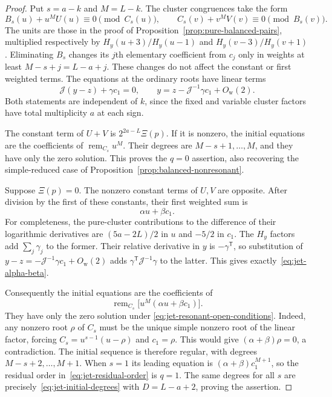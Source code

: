 \documentclass[11pt]{article}
\theoremstyle{definition}
\begin{document}
\begin{proof}
Put $s=a-k$ and $M=L-k$. The cluster congruences take the form
\[
 B_s(u)+u^MU(u)\equiv0\pmod{C_s(u)},\qquad
 C_s(v)+v^MV(v)\equiv0\pmod{B_s(v)}.
\]
The units are those in the proof of
Proposition~\ref{prop:pure-balanced-pairs}, multiplied respectively by
$H_y(u+3)/H_y(u-1)$ and $H_y(v-3)/H_y(v+1)$.
Eliminating $B_s$ changes its $j$th elementary coefficient from $c_j$
only in weights at least $M-s+j=L-a+j$. These changes do not affect
the constant or first weighted terms. The equations at the ordinary
roots have linear terms
\[
 \mathcal J(y-z)+\gamma c_1=0,
 \qquad y=z-\mathcal J^{-1}\gamma c_1+O_{\mathrm w}(2).
\]
Both statements are independent of $k$, since the fixed and variable
cluster factors have total multiplicity $a$ at each sign.

The constant term of $U+V$ is $2^{2a-L}\Xi(p)$. If it is nonzero,
the initial equations are the coefficients of
$\operatorname{rem}_{C_s}u^M$. Their degrees are
$M-s+1,\ldots,M$, and they have only the zero solution. This proves
the $q=0$ assertion, also recovering the simple-reduced case of
Proposition~\ref{prop:balanced-nonresonant}.

Suppose $\Xi(p)=0$. The nonzero constant terms of $U,V$ are opposite.
After division by the first of these constants, their first weighted
sum is
\[
 \alpha u+\beta c_1.
\]
For completeness, the pure-cluster contributions to the difference of
their logarithmic derivatives are $(5a-2L)/2$ in $u$ and $-5/2$ in
$c_1$. The $H_y$ factors add $\sum_j\gamma_j$ to the former. Their
relative derivative in $y$ is $-\gamma^{\mathsf T}$, so substitution
of $y-z=-\mathcal J^{-1}\gamma c_1+O_{\mathrm w}(2)$ adds
$\gamma^{\mathsf T}\mathcal J^{-1}\gamma$ to the latter. This gives
exactly~\eqref{eq:jet-alpha-beta}.

Consequently the initial equations are the coefficients of
\[
 \operatorname{rem}_{C_s}
       \bigl[u^M(\alpha u+\beta c_1)\bigr].
\]
They have only the zero solution under
\eqref{eq:jet-resonant-open-conditions}. Indeed, any nonzero root
$\rho$ of $C_s$ must be the unique simple nonzero root of the linear
factor, forcing $C_s=u^{s-1}(u-\rho)$ and $c_1=\rho$. This would give
$(\alpha+\beta)\rho=0$, a contradiction. The initial sequence is
therefore regular, with degrees $M-s+2,\ldots,M+1$. When $s=1$ its
leading equation is $(\alpha+\beta)c_1^{M+1}$, so the residual order
in~\eqref{eq:jet-residual-order} is $q=1$. The same degrees for all
$s$ are precisely~\eqref{eq:jet-initial-degrees} with
$D=L-a+2$, proving the assertion.
\end{proof}
\end{document}

